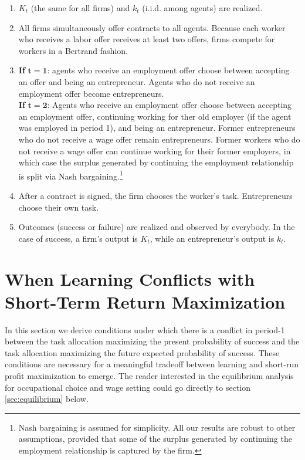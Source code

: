 \documentclass[12pt,american]{paper}
\theoremstyle{remark}
\begin{document}
\begin{enumerate}[(1)]\itemsep=0.05em
	\item  $K_t$ (the same for all firms) and  $k_t$ (i.i.d. among agents) are realized.
   \item All firms simultaneously offer contracts to all agents.  Because each worker who receives a labor offer receives at least two offers, firms compete for workers in a Bertrand fashion.
    \item \textbf{If} $\mathbf{t=1}$: agents who receive an employment offer choose between accepting an offer and being an entrepreneur. Agents who do not receive an employment offer become entrepreneurs.\\
    \textbf{If}  $\mathbf{t=2}$: Agents who receive an employment offer choose between accepting an employment offer, continuing working for ther old employer (if the agent was employed in period 1), and being an entrepreneur. Former entrepreneurs who do not receive a wage offer remain entrepreneurs. Former workers  who do not receive a wage offer can continue working for their former employers, in which case the surplus generated by continuing the employment relationship is split via Nash bargaining.\footnote{Nash bargaining is assumed for simplicity. All our results are robust to other assumptions, provided that some of the surplus generated by continuing the employment relationship is captured by the firm.}
    \item After a contract is signed, the firm chooses the worker's task. Entrepreneurs choose their own task.
	\item Outcomes (success or failure) are realized and observed by everybody.  
In the case of success, a firm's output is $K_t$, while an entrepreneur's output is $k_{t}$.
	\end{enumerate}

\section{When Learning Conflicts with Short-Term Return Maximization\label{sec:learning}}
In this section we derive conditions under which there is a conflict in period-1 between the task allocation maximizing the present probability of success and the task allocation maximizing the future expected probability of success.  These conditions are necessary for a meaningful tradeoff between learning and short-run profit maximization to emerge. %
The reader interested in the equilibrium analysis for occupational choice and wage setting could go directly to section \ref{sec:equilibrium} below.
\end{document}
